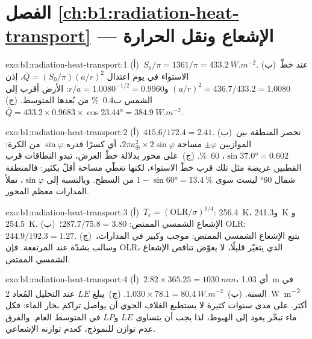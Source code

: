 \section*{الفصل \ref{ch:b1:radiation-heat-transport} --- الإشعاع ونقل الحرارة}

\begin{solution}{exo:b1:radiation-heat-transport:1}
(أ)~$S_0/\pi = 1361/\pi = \qty{433.2}{W.m^{-2}}$. (ب)~عند خطّ الاستواء في يوم اعتدال
$\bar Q = (S_0/\pi)(a/r)^2$، إذن $(a/r)^2 = 436.7/433.2 = 1.0080$ و$r/a =
1.0080^{-1/2} = 0.9960$: الأرض أقرب إلى الشمس ب\qty{0.4}{\percent} من بُعدها المتوسط. (ج)~$\bar Q = 433.2 \times 0.9683 \times \cos\ang{23.44} =
\qty{384.9}{W.m^{-2}}$.
\end{solution}

\begin{solution}{exo:b1:radiation-heat-transport:2}
(أ)~$415.6/172.4 = 2.41$. (ب)~تحصر المنطقة بين الموازيين $\pm\varphi$ مساحة $2\pi a_\oplus^2 \times 2\sin\varphi$، أي كسرًا قدره $\sin\varphi$ من الكرة:
$\sin\ang{37.0} = 0.602$، \qty{60}{\percent}. (ج)~على محور بدلالة خطّ العرض، تبدو النطاقات قرب القطبين عريضة مثل تلك قرب خطّ الاستواء، لكنها تغطّي مساحة أقلّ بكثير: فالمنطقة شمال \ang{60} ليست سوى $1 - \sin\ang{60} =
\qty{13.4}{\percent}$ من السطح. وبالنسبة إلى $\sin\varphi$، تملأ المدارات معظم المحور.
\end{solution}

\begin{solution}{exo:b1:radiation-heat-transport:3}
(أ)~$T_e = (\text{OLR}/\sigma)^{1/4}$: \qty{256.4}{K}، و\qty{241.3}{K} و
\qty{254.5}{K}. (ب)~الإشعاع الشمسي الممتص: $287.7/75.8 = 3.80$؛ OLR: $244.9/192.3 =
1.27$. (ج)~يتبع  الإشعاع الشمسي الممتص: موجب وكبير في المدارات، وسالب بشدّة عند  المرتفعة. فإن OLR، الذي يتغيّر قليلًا، لا يعوّض تناقص الإشعاع الشمسي الممتص.
\end{solution}

\begin{solution}{exo:b1:radiation-heat-transport:4}
(أ)~$2.82 \times 365.25 = \qty{1030}{mm}$، أي \qty{1.03}{m} في السنة. (ب)~$1.030 \times
78.1 = \qty{80.4}{W.m^{-2}}$.
(ج)~يبلغ $LE$ عند التحليل المُعاد \qty{2}{W.m^{-2}} أكثر. على مدى سنوات كثيرة لا يستطيع الغلاف الجوي أن يواصل تراكم بخار الماء: فكل ماء تبخّر يعود إلى الهبوط، لذا يجب أن يتساوى $LE$ و$LP$ في المتوسط العام. والفرق عدم توازن للنموذج، كعدم توازنه الإشعاعي.
\end{solution}

